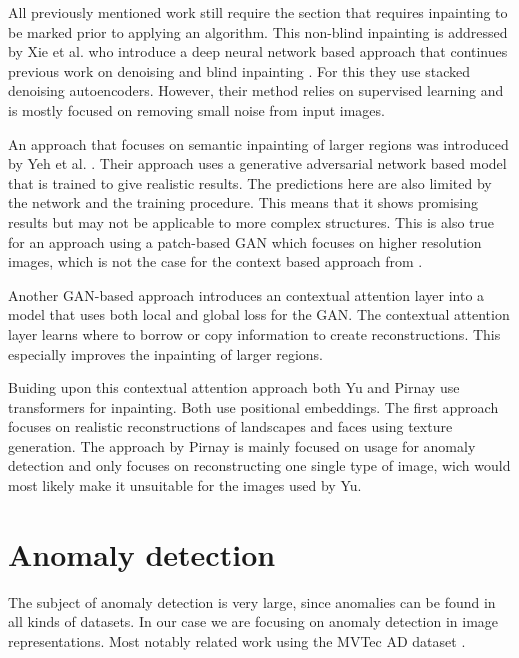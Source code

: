 All previously mentioned work still require the section that requires inpainting to be marked prior to applying an algorithm. This non-blind inpainting is addressed by Xie et al. \cite{xie_image_2012} who introduce a deep neural network based approach that continues previous work on denoising \cite{mairal_sparse_2008} and blind inpainting \cite{dong_wavelet_2012}. For this they use stacked denoising autoencoders. However, their method relies on supervised learning and is mostly focused on removing small noise from input images.

An approach that focuses on semantic inpainting of larger regions was introduced by Yeh et al. \cite{yeh_semantic_2017}. Their approach uses a generative adversarial network based model that is trained to give realistic results. The predictions here are also limited by the network and the training procedure. This means that it shows promising results but may not be applicable to more complex structures. This is also true for an approach using a patch-based GAN \cite{demir_patch-based_2018} which focuses on higher resolution images, which is not the case for the context based approach from \cite{pathak_context_2016}.

Another GAN-based approach \cite{yu_generative_2018} introduces an contextual attention layer into a model that uses both local and global loss for the GAN. The contextual attention layer learns where to borrow or copy information to create reconstructions. This especially improves the inpainting of larger regions.

Buiding upon this contextual attention approach both Yu \cite{yu_diverse_2021} and Pirnay \cite{pirnay_inpainting_2021} use transformers for inpainting. Both use positional embeddings. The first approach focuses on realistic reconstructions of landscapes and faces using texture generation. The approach by Pirnay is mainly focused on usage for anomaly detection and only focuses on reconstructing one single type of image, wich would most likely make it unsuitable for the images used by Yu.

\section{Anomaly detection}
\label{sec:relwork:anomaly-detection}

The subject of anomaly detection is very large, since anomalies can be found in all kinds of datasets. In our case we are focusing on anomaly detection in image representations. Most notably related work using the MVTec AD dataset \cite{bergmann_mvtec_2019}.

